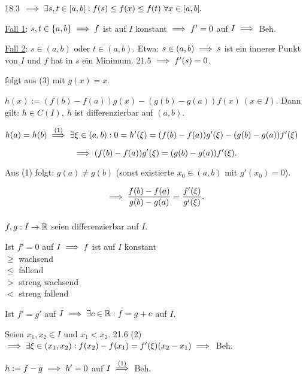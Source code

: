 \documentclass[a4paper,oneside,DIV15,BCOR12mm]{scrbook}
\begin{document}
\begin{beweise}
\item 18.3 $\implies \exists s,t \in  [a,b]: f(s) \le f(x) \le f(t)\ \forall x \in [a,b].$

\underline{Fall 1}: $s,t \in \{a,b\} \implies f$ ist auf $I$ konstant $\implies f' = 0$ auf $I \implies$ Beh.

\underline{Fall 2}: $s \in (a,b)$ oder $t \in (a,b)$. Etwa: $s \in (a,b) \implies s$ ist ein innerer Punkt von $I$ und $f$ hat in $s$ ein Minimum. 21.5 $\implies f'(s) = 0$.
\item folgt aus (3) mit $g(x) = x$.
\item $h(x) := (f(b)-f(a))g(x) - (g(b)-g(a))f(x)\ (x \in I)$. Dann gilt: $h \in C(I),\ h$ ist differenzierbar auf $(a,b)$.

$h(a) = h(b) \overset{\text{(1)}}{\implies} \exists \xi \in (a,b): 0 = h'(\xi) = (f(b)-f(a))g'(\xi) - (g(b)-g(a))f'(\xi)$

$$\implies (f(b)-f(a))g'(\xi) = (g(b)-g(a))f'(\xi).$$

Aus (1) folgt: $g(a) \ne g(b)$ (sonst existierte $x_0 \in (a,b)$ mit $g'(x_0) = 0$).

$$\implies \frac{f(b)-f(a)}{g(b)-g(a)} = \frac{f'(\xi)}{g'(\xi)}.$$
$ $
\end{beweise}

\begin{folgerungen}

$f,g: I \to \mathbb{R}$ seien differenzierbar auf $I$.
\begin{liste}
\item \begin{tabbing}
Ist $f' $\=$= 0$ auf $I \implies f$ ist auf $I$ \=konstant\\
\>$\geq$ \>wachsend\\
\>$\leq$ \>fallend\\
\>$>$    \>streng wachsend\\
\>$<$    \>streng fallend\\
\end{tabbing}

\item Ist $f' = g'$ auf $I \implies \exists c \in \mathbb{R}: f=g+c$ auf $I$.
\end{liste}
\end{folgerungen}

\begin{beweise}
\item Seien $x_1,x_2 \in I$ und $x_1<x_2$. 21.6 (2) $\implies \exists \xi \in (x_1,x_2): f(x_2)-f(x_1) = f'(\xi)(x_2-x_1) \implies$ Beh.
\item $h := f-g \implies h' = 0$ auf $I \overset{(1)}{\implies}$ Beh.
\end{beweise}
\end{document}
